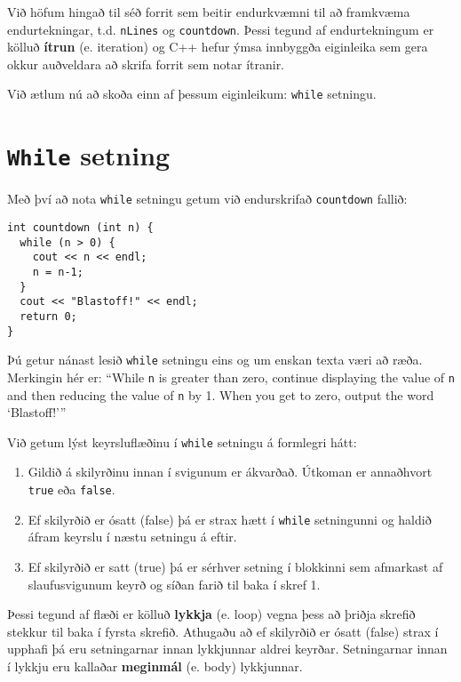 Við höfum hingað til séð forrit sem beitir endurkvæmni til að framkvæma endurtekningar, t.d. {\tt nLines} og {\tt countdown}.
Þessi tegund af endurtekningum er kölluð {\bf ítrun} (e. iteration) og C++ hefur ýmsa innbyggða eiginleika sem gera okkur auðveldara að skrifa forrit sem notar ítranir.


Við ætlum nú að skoða einn af þessum eiginleikum: {\tt while} setningu.

\section{{\tt While} setning}

Með því að nota {\tt while} setningu getum við endurskrifað {\tt countdown} fallið:

\begin{verbatim}
int countdown (int n) {
  while (n > 0) {
    cout << n << endl;
    n = n-1;
  }
  cout << "Blastoff!" << endl;
  return 0;
}
\end{verbatim}
%
Þú getur nánast lesið {\tt while} setningu eins og um enskan texta væri að ræða.
Merkingin hér er: ``While {\tt n} is greater than
zero, continue displaying the value of {\tt n} and then reducing
the value of {\tt n} by 1.  When you get to zero, output the
word `Blastoff!'''

Við getum lýst keyrsluflæðinu í {\tt while} setningu á formlegri hátt:

\begin{enumerate}

\item Gildið á skilyrðinu innan í svigunum er ákvarðað. Útkoman er annaðhvort {\tt true} eða {\tt false}.

\item Ef skilyrðið er ósatt (false) þá er strax hætt í {\tt while} setningunni og haldið áfram keyrslu í næstu setningu á eftir.

\item Ef skilyrðið er satt (true) þá er sérhver setning í blokkinni sem afmarkast af slaufusvigunum keyrð og síðan farið til baka í skref 1.

\end{enumerate}

Þessi tegund af flæði er kölluð {\bf lykkja} (e. loop) vegna þess að þriðja skrefið stekkur til baka í fyrsta skrefið.
Athugaðu að ef skilyrðið er ósatt (false) strax í upphafi þá eru setningarnar innan lykkjunnar aldrei keyrðar.
Setningarnar innan í lykkju eru kallaðar {\bf meginmál} (e. body) lykkjunnar.

